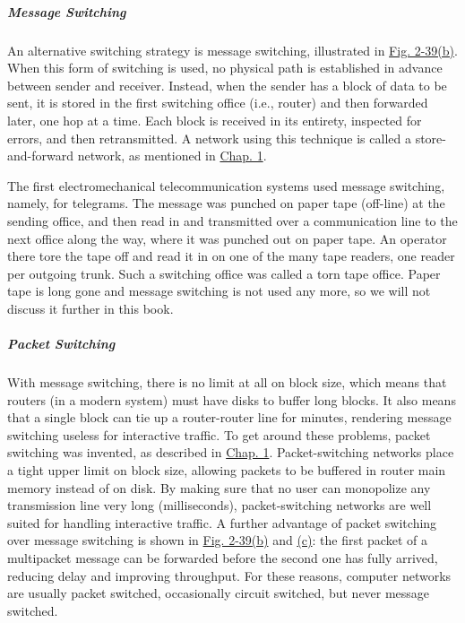 \documentclass[b5paper,11pt]{memoir}
\begin{document}
\protect\hypertarget{0130661023_ch02lev1sec5.htmlux5cux23ch02lev3sec17}{}{}

\subparagraph{Message Switching}

An alternative switching strategy is {message switching}, illustrated in
\protect\hyperlink{0130661023_ch02lev1sec5.htmlux5cux23ch02fig39}{Fig.
2-39(b)}. When this form of switching is used, no physical path is
established in advance between sender and receiver. Instead, when the
sender has a block of data to be sent, it is stored in the first
switching office (i.e., router) and then forwarded later, one hop at a
time. Each block is received in its entirety, inspected for errors, and
then retransmitted. A network using this technique is called a
{store-and-forward} network, as mentioned in
\protect\hyperlink{0130661023_ch01.htmlux5cux23ch01}{Chap. 1}.

The first electromechanical telecommunication systems used message
switching, namely, for telegrams. The message was punched on paper tape
(off-line) at the sending office, and then read in and transmitted over
a communication line to the next office along the way, where it was
punched out on paper tape. An operator there tore the tape off and read
it in on one of the many tape readers, one reader per outgoing trunk.
Such a switching office was called a {torn tape office}. Paper tape is
long gone and message switching is not used any more, so we will not
discuss it further in this book.

\protect\hypertarget{0130661023_ch02lev1sec5.htmlux5cux23ch02lev3sec18}{}{}

\subparagraph{Packet Switching}

With message switching, there is no limit at all on block size, which
means that routers (in a modern system) must have disks to buffer long
blocks. It also means that a single block can tie up a router-router
line for minutes, rendering message switching useless for interactive
traffic. To get around these problems, {packet switching} was invented,
as described in
\protect\hyperlink{0130661023_ch01.htmlux5cux23ch01}{Chap. 1}.
Packet-switching networks place a tight upper limit on block size,
allowing packets to be buffered in router main memory instead of on
disk. By making sure that no user can monopolize any transmission line
very long (milliseconds), packet-switching networks are well suited for
handling interactive traffic. A further advantage of packet switching
over message switching is shown in
\protect\hyperlink{0130661023_ch02lev1sec5.htmlux5cux23ch02fig39}{Fig.
2-39(b)} and
\protect\hyperlink{0130661023_ch02lev1sec5.htmlux5cux23ch02fig39}{(c)}:
the first packet of a multipacket message can be forwarded before the
second one has fully arrived, reducing delay and improving throughput.
For these reasons, computer networks are usually packet switched,
occasionally circuit switched, but never message switched.
\end{document}

